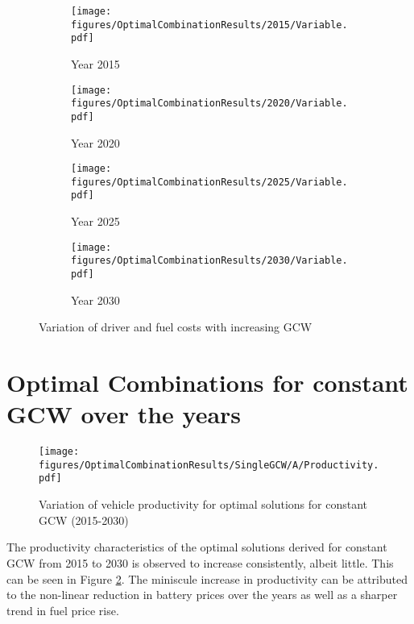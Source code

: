 \documentclass[ExampleMasters.tex]{subfiles}
\begin{document}
	\newpage

	\begin{figure}[ht!]
		\begin{subfigure}{.5\textwidth}
			\centering
			\texttt{[image: figures/OptimalCombinationResults/2015/Variable.pdf]}
			\caption{Year 2015}
		\end{subfigure}
		\begin{subfigure}{.5\textwidth}
			\centering
			\texttt{[image: figures/OptimalCombinationResults/2020/Variable.pdf]}
			\caption{Year 2020}
		\end{subfigure}
		\begin{subfigure}{.5\textwidth}
			\centering
			\texttt{[image: figures/OptimalCombinationResults/2025/Variable.pdf]}
			\caption{Year 2025}
		\end{subfigure}
		\begin{subfigure}{.5\textwidth}
			\centering
			\texttt{[image: figures/OptimalCombinationResults/2030/Variable.pdf]}
			\caption{Year 2030}
		\end{subfigure}
		\caption{Variation of driver and fuel costs with increasing GCW}
		\label{variableCostVsGCWOverYears}
	\end{figure}

	\newpage

\section{Optimal Combinations for constant GCW over the years}

	\begin{figure}[ht!]
		\centering
		\texttt{[image: figures/OptimalCombinationResults/SingleGCW/A/Productivity.pdf]}
		\caption{Variation of vehicle productivity for optimal solutions for constant GCW (2015-2030)}
		\label{prodConstGCWOverYears}
	\end{figure}

	The productivity characteristics of the optimal solutions derived for constant GCW from 2015 to 2030 is observed to increase consistently, albeit little. This can be seen in Figure \ref{prodConstGCWOverYears}. The miniscule increase in productivity can be attributed to the non-linear reduction in battery prices over the years as well as a sharper trend in fuel price rise.\\
\end{document}
